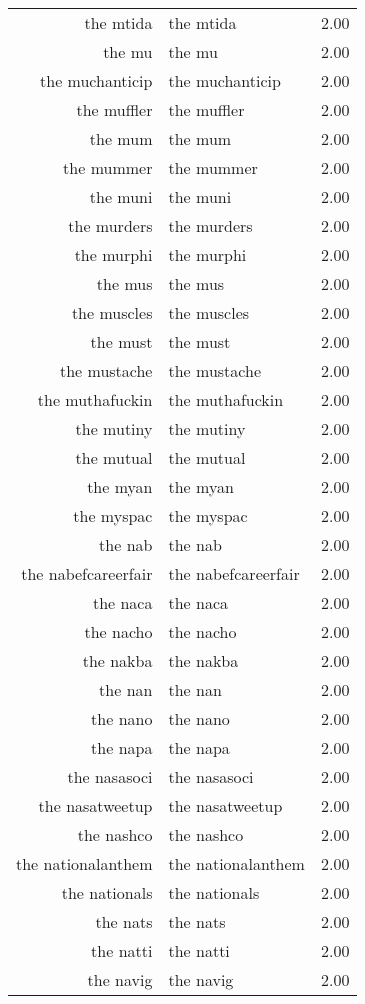 \begin{table}[ht]
\begin{tabular}{rlr}
  the mtida & the mtida & 2.00 \\ 
  the mu & the mu & 2.00 \\ 
  the muchanticip & the muchanticip & 2.00 \\ 
  the muffler & the muffler & 2.00 \\ 
  the mum & the mum & 2.00 \\ 
  the mummer & the mummer & 2.00 \\ 
  the muni & the muni & 2.00 \\ 
  the murders & the murders & 2.00 \\ 
  the murphi & the murphi & 2.00 \\ 
  the mus & the mus & 2.00 \\ 
  the muscles & the muscles & 2.00 \\ 
  the must & the must & 2.00 \\ 
  the mustache & the mustache & 2.00 \\ 
  the muthafuckin & the muthafuckin & 2.00 \\ 
  the mutiny & the mutiny & 2.00 \\ 
  the mutual & the mutual & 2.00 \\ 
  the myan & the myan & 2.00 \\ 
  the myspac & the myspac & 2.00 \\ 
  the nab & the nab & 2.00 \\ 
  the nabefcareerfair & the nabefcareerfair & 2.00 \\ 
  the naca & the naca & 2.00 \\ 
  the nacho & the nacho & 2.00 \\ 
  the nakba & the nakba & 2.00 \\ 
  the nan & the nan & 2.00 \\ 
  the nano & the nano & 2.00 \\ 
  the napa & the napa & 2.00 \\ 
  the nasasoci & the nasasoci & 2.00 \\ 
  the nasatweetup & the nasatweetup & 2.00 \\ 
  the nashco & the nashco & 2.00 \\ 
  the nationalanthem & the nationalanthem & 2.00 \\ 
  the nationals & the nationals & 2.00 \\ 
  the nats & the nats & 2.00 \\ 
  the natti & the natti & 2.00 \\ 
  the navig & the navig & 2.00 \\ 

\end{tabular}
\end{table}
